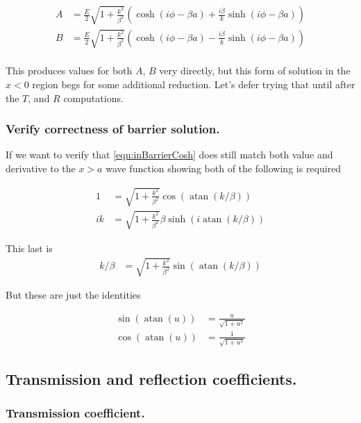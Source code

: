 \documentclass{article}
\DeclareMathOperator{\atan}{atan}
\begin{document}
\begin{align*}
A &= \frac{E}{2} \sqrt{1 + \frac{k^2}{\beta^2}} \left(
\cosh\left( i\phi -\beta a \right) + \frac{i\beta}{k} \sinh\left( i\phi -\beta a \right) 
\right) \\
B &= \frac{E}{2} \sqrt{1 + \frac{k^2}{\beta^2}} \left(
\cosh\left( i\phi -\beta a \right) - \frac{i\beta}{k} \sinh\left( i\phi -\beta a \right) 
\right) \\
\end{align*}

This produces values for both $A$, $B$ very directly, but this 
form of solution in the $x<0$ region begs for some additional reduction.  Let's
defer trying that until after the $T$, and $R$ computations.

\subsubsection{ Verify correctness of barrier solution. }

If we want to verify that \ref{eqn:inBarrierCosh} 
does still match both value and derivative to the $x>a$ wave function
showing both of the following is required

\begin{align*}
1 &= \sqrt{1 + \frac{k^2}{\beta^2}} \cos\left( \atan(k/\beta) \right) \\
ik &=
\sqrt{1 + \frac{k^2}{\beta^2}} \beta \sinh\left( i \atan(k/\beta) \right)
\end{align*}

This last is
\begin{align*}
k/\beta &=
\sqrt{1 + \frac{k^2}{\beta^2}} \sin\left( \atan(k/\beta) \right)
\end{align*}

But these are just the identities

\begin{align*}
\sin\left( \atan(u) \right) &= \frac{u}{\sqrt{1 + u^2}} \\
\cos\left( \atan(u) \right) &= \frac{1}{\sqrt{1 + u^2}}
\end{align*}

\subsection{ Transmission and reflection coefficients. }

\subsubsection{ Transmission coefficient. }
\end{document}
